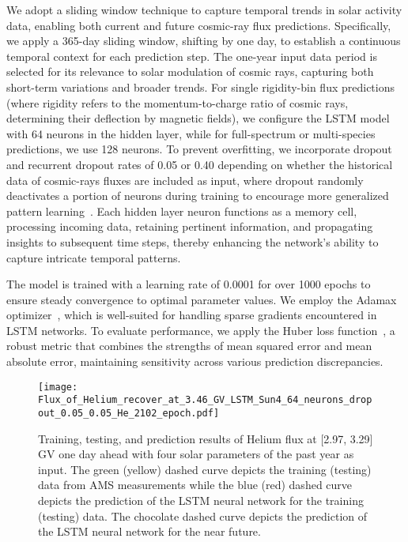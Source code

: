 \documentclass[twocolumn,,12pt]{aastex631}
\begin{document}
We adopt a sliding window technique to capture temporal trends in solar activity data, enabling both current and future cosmic-ray flux predictions. Specifically, we apply a 365-day sliding window, shifting by one day, to establish a continuous temporal context for each prediction step. The one-year input data period is selected for its relevance to solar modulation of cosmic rays, capturing both short-term variations and broader trends. For single rigidity-bin flux predictions (where rigidity refers to the momentum-to-charge ratio of cosmic rays, determining their deflection by magnetic fields), we configure the LSTM model with 64 neurons in the hidden layer, while for full-spectrum or multi-species predictions, we use 128 neurons. To prevent overfitting, we incorporate dropout and recurrent dropout rates of 0.05 or 0.40 depending on whether the historical data of cosmic-rays fluxes are included as input, where dropout randomly deactivates a portion of neurons during training to encourage more generalized pattern learning~\cite{srivastava2014dropout,semeniuta2016recurrent}. Each hidden layer neuron functions as a memory cell, processing incoming data, retaining pertinent information, and propagating insights to subsequent time steps, thereby enhancing the network's ability to capture intricate temporal patterns.

The model is trained with a learning rate of 0.0001 for over 1000 epochs to ensure steady convergence to optimal parameter values. We employ the Adamax optimizer~\cite{kingma2014adam}, which is well-suited for handling sparse gradients encountered in LSTM networks. To evaluate performance, we apply the Huber loss function~\cite{10.1214/aoms/1177703732}, a robust metric that combines the strengths of mean squared error and mean absolute error, maintaining sensitivity across various prediction discrepancies.

\begin{figure*}[tbh!]
\centering
\texttt{[image: Flux\_of\_Helium\_recover\_at\_3.46\_GV\_LSTM\_Sun4\_64\_neurons\_dropout\_0.05\_0.05\_He\_2102\_epoch.pdf]}
\caption{Training, testing, and prediction results of Helium flux at [2.97, 3.29] GV one day ahead with four solar parameters of the past year as input. The green (yellow) dashed curve depicts the training (testing) data from AMS measurements while the blue (red) dashed curve depicts the prediction of the LSTM neural network for the training (testing) data. The chocolate dashed curve depicts the prediction of the LSTM neural network for the near future.}
\label{fig: Flux_of_Helium_4_solar} 
\end{figure*}
\end{document}
